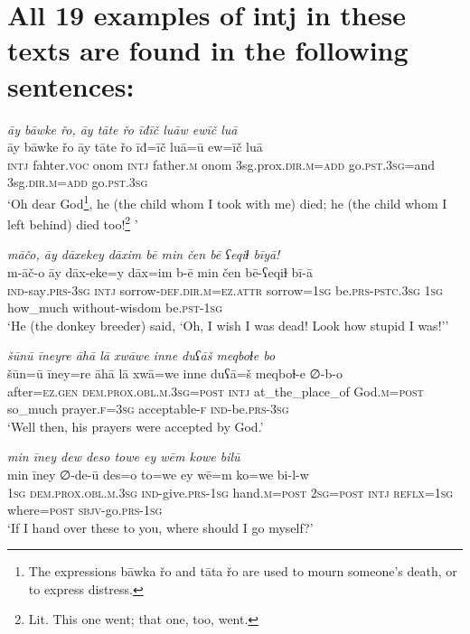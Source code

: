 \chapter{All 19 examples of intj in these texts are found in the following sentences:}

\ea \label{ZQ.32}
\textit{āy bāwke řo, āy tāte řo īđīč luāw ewīč luā} \\ 
\gll āy bāwke řo āy tāte řo īđ=īč luā=ū ew=īč luā \\ 
 \textsc{intj} fahter.\textsc{voc} onom \textsc{intj} father\textsc{.m} onom 3sg.prox\textsc{.dir}\textsc{.m}\textsc{=add} go\textsc{.pst}\textsc{.3sg}=and 3sg\textsc{.dir}\textsc{.m}\textsc{=add} go\textsc{.pst}\textsc{.3sg} \\ 
\glt `Oh dear God\footnote{The expressions bāwka řo and tāta řo are used to mourn someone’s death, or to express distress.}, he (the child whom I took with me) died; he (the child whom I left behind) died too!\footnote{Lit. This one went; that one, too, went.} '
\z 
 
\ea \label{HB.19}
\textit{māčo, āy dāxekey dāxim bē min čen bē ʕeqiɫ bīyā!} \\ 
\gll m-āč-o āy dāx-eke=y dāx=im b-ē min čen bē-ʕeqiɫ bī-ā \\ 
 \textsc{ind-}say\textsc{.prs}\textsc{-3sg} \textsc{intj} sorrow\textsc{-def}\textsc{.dir}\textsc{.m}\textsc{=ez}.\textsc{attr} sorrow\textsc{=1sg} be\textsc{.prs}\textsc{-pstc}\textsc{.3sg} \textsc{1sg} how\_much without-wisdom be\textsc{.pst}\textsc{-1sg} \\ 
\glt `He (the donkey breeder) said, ‘Oh, I wish I was dead! Look how stupid I was!’'
\z 
 
\ea \label{DG.60}
\textit{šūnū īneyre āhā lā xwāwe inne duʕāš meqboɫe bo} \\ 
\gll šūn=ū īney=re āhā lā xwā=we inne duʕā=š meqboɫ-e ∅-b-o \\ 
 after\textsc{=ez}\textsc{.gen} \textsc{dem.prox}\textsc{.obl}\textsc{.m}\textsc{.3sg}\textsc{=\textsc{post}} \textsc{intj} at\_the\_place\_of God\textsc{.m}\textsc{=\textsc{post}} so\_much prayer\textsc{\textsc{.f}}\textsc{=3sg} acceptable\textsc{-f} \textsc{ind-}be\textsc{.prs}\textsc{-3sg} \\ 
\glt `Well then, his prayers were accepted by God.'
\z 
 
\ea \label{DP.23}
\textit{min īney dew deso towe ey wēm kowe bilū} \\ 
\gll min īney ∅-de-ū des=o to=we ey wē=m ko=we bi-l-w \\ 
 \textsc{1sg} \textsc{dem.prox}\textsc{.obl}\textsc{.m}\textsc{.3sg} \textsc{ind-}give\textsc{.prs}\textsc{-1sg} hand\textsc{.m}\textsc{=\textsc{post}} \textsc{2sg}\textsc{=\textsc{post}} \textsc{intj} \textsc{reflx}\textsc{=1sg} where\textsc{=\textsc{post}} \textsc{sbjv-}go\textsc{.prs}\textsc{-1sg} \\ 
\glt `If I hand over these to you, where should I go myself?'
\z 
 
